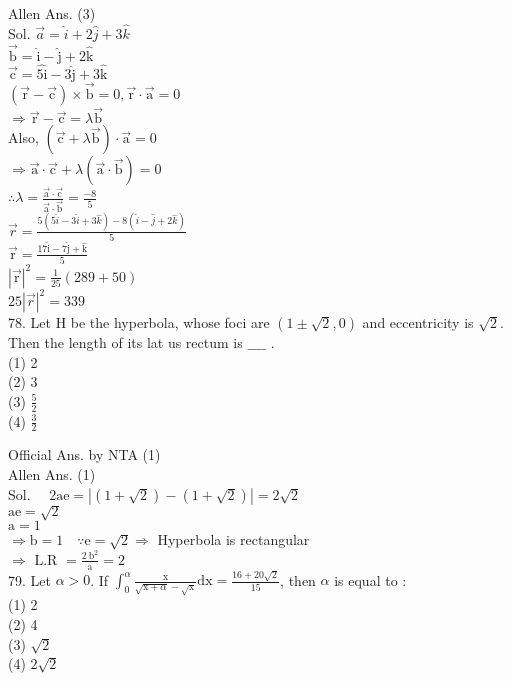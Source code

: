 \documentclass[10pt]{article}
\begin{document}
Allen Ans. (3)\\
Sol. \(\vec{a}=\hat{i}+2 \hat{j}+3 \hat{k}\)\\
\(\overrightarrow{\mathrm{b}}=\hat{\mathrm{i}}-\hat{\mathrm{j}}+2 \hat{\mathrm{k}}\)\\
\(\overrightarrow{\mathrm{c}}=\hat{5 \mathrm{i}}-3 \hat{\mathrm{j}}+3 \hat{\mathrm{k}}\)\\
\((\overrightarrow{\mathrm{r}}-\overrightarrow{\mathrm{c}}) \times \overrightarrow{\mathrm{b}}=0, \overrightarrow{\mathrm{r}} \cdot \overrightarrow{\mathrm{a}}=0\)\\
\(\Rightarrow \overrightarrow{\mathrm{r}}-\overrightarrow{\mathrm{c}}=\lambda \overrightarrow{\mathrm{b}}\)\\
Also, \((\overrightarrow{\mathrm{c}}+\lambda \overrightarrow{\mathrm{b}}) \cdot \overrightarrow{\mathrm{a}}=0\)\\
\(\Rightarrow \overrightarrow{\mathrm{a}} \cdot \overrightarrow{\mathrm{c}}+\lambda(\overrightarrow{\mathrm{a}} \cdot \overrightarrow{\mathrm{b}})=0\)\\
\(\therefore \lambda=\frac{\overrightarrow{\mathrm{a}} \cdot \overrightarrow{\mathrm{c}}}{\overrightarrow{\mathrm{a}} \cdot \overrightarrow{\mathrm{b}}}=\frac{-8}{5}\)\\
\(\vec{r}=\frac{5(5 \hat{i}-3 \hat{i}+3 \hat{k})-8(\hat{i}-\hat{j}+2 \hat{k})}{5}\)\\
\(\overrightarrow{\mathrm{r}}=\frac{17 \hat{\mathrm{i}}-7 \hat{\mathrm{j}}+\hat{\mathrm{k}}}{5}\)\\
\(|\overrightarrow{\mathrm{r}}|^{2}=\frac{1}{25}(289+50)\)\\
\(25|\vec{r}|^{2}=339\)\\
78. Let H be the hyperbola, whose foci are \((1 \pm \sqrt{2}, 0)\) and eccentricity is \(\sqrt{2}\). Then the length of its lat us rectum is \(\_\_\_\_\) .\\
(1) 2\\
(2) 3\\
(3) \(\frac{5}{2}\)\\
(4) \(\frac{3}{2}\)

Official Ans. by NTA (1)\\
Allen Ans. (1)\\
Sol. \(\quad 2 \mathrm{ae}=|(1+\sqrt{2})-(1+\sqrt{2})|=2 \sqrt{2}\)\\
\(\mathrm{ae}=\sqrt{2}\)\\
\(\mathrm{a}=1\)\\
\(\Rightarrow \mathrm{b}=1 \quad \because \mathrm{e}=\sqrt{2} \Rightarrow\) Hyperbola is rectangular\\
\(\Rightarrow\) L.R \(=\frac{2 \mathrm{~b}^{2}}{\mathrm{a}}=2\)\\
79. Let \(\alpha>0\). If \(\int_{0}^{\alpha} \frac{\mathrm{x}}{\sqrt{\mathrm{x}+\alpha}-\sqrt{\mathrm{x}}} \mathrm{dx}=\frac{16+20 \sqrt{2}}{15}\), then \(\alpha\) is equal to :\\
(1) 2\\
(2) 4\\
(3) \(\sqrt{2}\)\\
(4) \(2 \sqrt{2}\)
\end{document}
